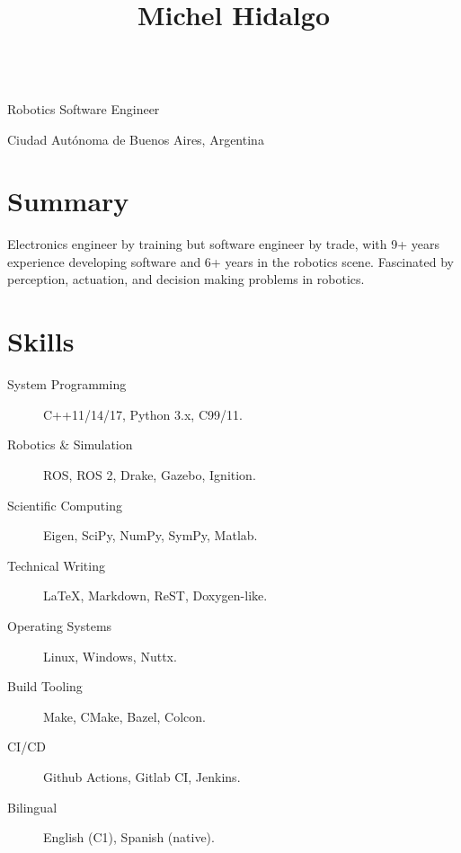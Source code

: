 \documentclass[english, letterpaper]{resume}
\begin{document}
\begin{center}
  \title{Michel Hidalgo} \\
  Robotics Software Engineer \\
  \address{Buenos Aires}{
    Ciudad Autónoma de Buenos Aires,
    Argentina} \\
  \begin{inlined}
    \item {}
    \item {}
    \item {}
  \end{inlined}
\end{center}

\section*{Summary}

Electronics engineer by training but software engineer by trade, with 9+ years experience developing software and 6+ years in the robotics scene. Fascinated by perception, actuation, and decision making problems in robotics.

\section*{Skills}

\hfill
\begin{minipage}{0.55\linewidth}
  \begin{description}
    \item[System Programming] C++11/14/17, Python 3.x, C99/11.
    \item[Robotics \& Simulation] ROS, ROS 2, Drake, Gazebo, Ignition.
    \item[Scientific Computing] Eigen, SciPy, NumPy, SymPy, Matlab.
    \item[Technical Writing] La\TeX, Markdown, ReST, Doxygen-like.
  \end{description}
\end{minipage}\hfill
\begin{minipage}{0.4\linewidth}
  \begin{description}
    \item[Operating Systems] Linux, Windows, Nuttx.
    \item[Build Tooling] Make, CMake, Bazel, Colcon.
    \item[CI/CD] Github Actions, Gitlab CI, Jenkins.
    \item[Bilingual] English (C1), Spanish (native).
  \end{description}
\end{minipage}
\hfill
\end{document}

